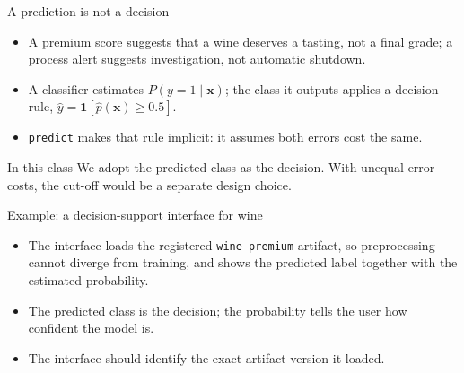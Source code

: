 \begin{frame}{A prediction is not a decision}
\begin{itemize}
\item A premium score suggests that a wine deserves a tasting, not a final grade; a process alert suggests investigation, not automatic shutdown.
\item A classifier estimates $P(y = 1 \mid \mathbf{x})$; the class it outputs applies a decision rule, $\hat{y} = \mathbf{1}[\hat{p}(\mathbf{x}) \ge 0.5]$.
\item \texttt{predict} makes that rule implicit: it assumes both errors cost the same.
\end{itemize}
\begin{block}{In this class}
We adopt the predicted class as the decision. With unequal error costs, the cut-off would be a separate design choice.
\end{block}
\coursefooter
\end{frame}

\begin{frame}{Example: a decision-support interface for wine}
\centering
{}
\vspace{0.6em}
\begin{itemize}\footnotesize
\item The interface loads the registered \texttt{wine-premium} artifact, so preprocessing cannot diverge from training, and shows the predicted label together with the estimated probability.
\item The predicted class is the decision; the probability tells the user how confident the model is.
\item The interface should identify the exact artifact version it loaded.
\end{itemize}
\coursefooter
\end{frame}

